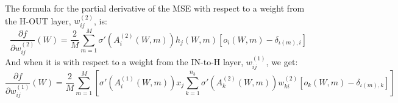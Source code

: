 \documentclass{article}
\begin{document}
The formula for the partial derivative of the MSE with respect to a weight from the H-OUT layer, $w^{(2)}_{ij}$, is:
\[
\frac{\partial f}{\partial w^{(2)}_{ij}}(W)=\frac{2}{M}\sum_{m=1}^M\sigma'\left(A_i^{(2)}(W,m)\right)h_j(W,m)\left[o_i(W,m)-\delta_{\iota(m),i}\right] 
\]
And when it is with respect to a weight from the IN-to-H layer, $w^{(1)}_{ij}$, we get:
\[
\frac{\partial f}{\partial w^{(1)}_{ij}}(W)=\frac{2}{M}
\sum_{m=1}^M\left[\sigma'\left(A_i^{(1)}(W,m)\right)x_j
\sum_{k=1}^{n_3}\sigma'\left(A_k^{(2)}(W,m)\right) w^{(2)}_{ki}\left[o_k(W,m)-\delta_{\iota(m),k}\right] \right]
\]
\end{document}
